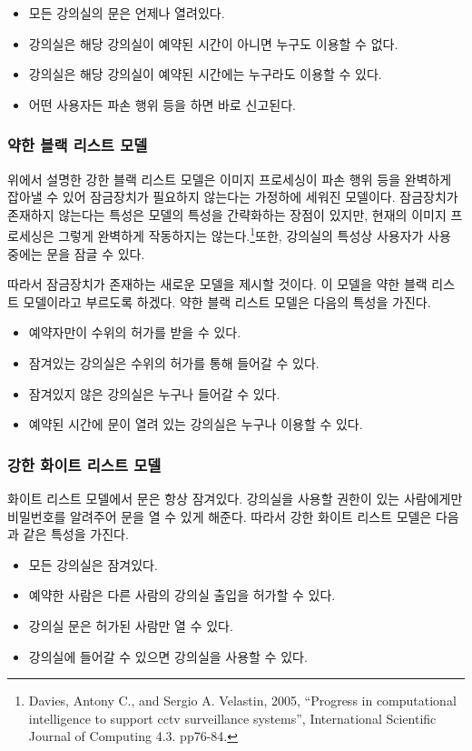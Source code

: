 \documentclass[11pt,a4paper]{article}
\begin{document}
\begin{itemize}
\item 모든 강의실의 문은 언제나 열려있다.
\item 강의실은 해당 강의실이 예약된 시간이 아니면 누구도 이용할 수 없다.
\item 강의실은 해당 강의실이 예약된 시간에는 누구라도 이용할 수 있다.
\item 어떤 사용자든 파손 행위 등을 하면 바로 신고된다.
\end{itemize}

\subsubsection{약한 블랙 리스트 모델}
위에서 설명한 강한 블랙 리스트 모델은 이미지 프로세싱이 파손 행위 등을 완벽하게
잡아낼 수 있어 잠금장치가 필요하지 않는다는 가정하에 세워진 모델이다.
잠금장치가 존재하지 않는다는 특성은 모델의 특성을 간략화하는 장점이 있지만,
현재의 이미지 프로세싱은 그렇게 완벽하게 작동하지는 않는다.\footnote{
 Davies, Antony C., and Sergio A. Velastin, 2005, ``Progress in computational
 intelligence to support cctv surveillance systems'', International Scientific
 Journal of Computing 4.3. pp76-84.
}또한, 강의실의
특성상 사용자가 사용 중에는 문을 잠글 수 있다.

따라서 잠금장치가 존재하는 새로운 모델을 제시할 것이다. 이 모델을 약한 블랙
리스트 모델이라고 부르도록 하겠다. 약한 블랙 리스트 모델은 다음의 특성을
가진다.
\begin{itemize}
\item 예약자만이 수위의 허가를 받을 수 있다.
\item 잠겨있는 강의실은 수위의 허가를 통해 들어갈 수 있다.
\item 잠겨있지 않은 강의실은 누구나 들어갈 수 있다.
\item 예약된 시간에 문이 열려 있는 강의실은 누구나 이용할 수 있다.
\end{itemize}

\subsubsection{강한 화이트 리스트 모델}
화이트 리스트 모델에서 문은 항상 잠겨있다. 강의실을 사용할 권한이 있는
사람에게만 비밀번호를 알려주어 문을 열 수 있게 해준다. 따라서 강한 화이트
리스트 모델은 다음과 같은 특성을 가진다.
\begin{itemize}
\item 모든 강의실은 잠겨있다.
\item 예약한 사람은 다른 사람의 강의실 출입을 허가할 수 있다.
\item 강의실 문은 허가된 사람만 열 수 있다.
\item 강의실에 들어갈 수 있으면 강의실을 사용할 수 있다.
\end{itemize}
\end{document}
